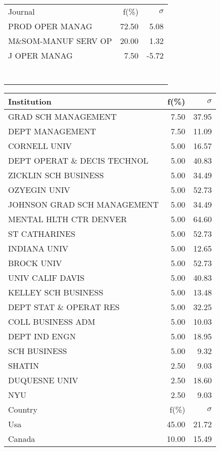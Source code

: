 \documentclass[a4paper,11pt]{report}
\begin{document}
\begin{landscape}
\begin{table}[!ht]
{\begin{tabular}{|l r  r|}
 &  & \\
\hline
\hline
Journal & f(\%) & $\sigma$\\
\hline
PROD OPER MANAG & 72.50 & 5.08\\
M\&SOM-MANUF SERV OP & 20.00 & 1.32\\
J OPER MANAG & 7.50 & -5.72\\
 &  & \\
 &  & \\
 &  & \\
 &  & \\
 &  & \\
 &  & \\
 &  & \\
\hline
\end{tabular}
}
{\scriptsize\begin{tabular}{|l r r|}
\hline
Institution & f(\%) & $\sigma$\\
\hline
GRAD SCH MANAGEMENT & 7.50 & 37.95\\
DEPT MANAGEMENT & 7.50 & 11.09\\
CORNELL UNIV & 5.00 & 16.57\\
DEPT OPERAT \& DECIS TECHNOL & 5.00 & 40.83\\
ZICKLIN SCH BUSINESS & 5.00 & 34.49\\
OZYEGIN UNIV & 5.00 & 52.73\\
JOHNSON GRAD SCH MANAGEMENT & 5.00 & 34.49\\
MENTAL HLTH CTR DENVER & 5.00 & 64.60\\
ST CATHARINES & 5.00 & 52.73\\
INDIANA UNIV & 5.00 & 12.65\\
BROCK UNIV & 5.00 & 52.73\\
UNIV CALIF DAVIS & 5.00 & 40.83\\
KELLEY SCH BUSINESS & 5.00 & 13.48\\
DEPT STAT \& OPERAT RES & 5.00 & 32.25\\
COLL BUSINESS ADM & 5.00 & 10.03\\
DEPT IND ENGN & 5.00 & 18.95\\
SCH BUSINESS & 5.00 & 9.32\\
SHATIN & 2.50 & 9.03\\
DUQUESNE UNIV & 2.50 & 18.60\\
NYU & 2.50 & 9.03\\
\hline
\hline
Country & f(\%) & $\sigma$\\
\hline
Usa & 45.00 & 21.72\\
Canada & 10.00 & 15.49\\

\end{tabular}}
\end{table}
\end{landscape}
\end{document}
